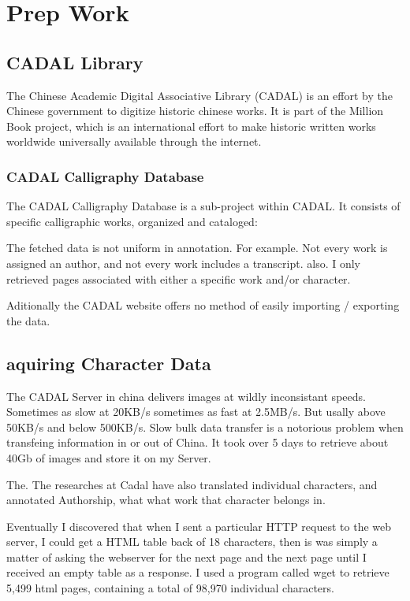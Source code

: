 \chapter{Prep Work}

\section{CADAL Library}

The Chinese Academic Digital Associative Library (CADAL) is an effort by the Chinese government to digitize historic chinese works.  It is part of the Million Book project, which is an international effort to make historic written works worldwide universally available through the internet.

\subsection{CADAL Calligraphy Database}
The CADAL Calligraphy Database is a sub-project within CADAL.  It consists of specific calligraphic works, organized and cataloged:


The fetched data is not uniform in annotation.  For example.  Not every work is assigned an author, and not every work includes a transcript.  also.  I only retrieved pages associated with either a specific work and/or character.

Aditionally the CADAL website offers no method of easily importing / exporting the data.  

\section{aquiring Character Data}

The CADAL Server in china delivers images at wildly inconsistant speeds.  Sometimes as slow at 20KB/s sometimes as fast at 2.5MB/s.  But usally above 50KB/s and below 500KB/s.  Slow bulk data transfer is a notorious problem when transfeing information in or out of China.  It took over 5 days to retrieve about 40Gb of images and store it on my Server.

The.  The researches at Cadal have also translated individual characters, and annotated Authorship, what what work that character belongs in.

Eventually I discovered that when I sent a particular HTTP request to the web server, I could get a HTML table back of 18 characters,  then is was simply a matter of asking the webserver for the next page and the next page until I received an empty table as a response.  I used a program called wget to retrieve 5,499 html pages, containing a total of 98,970 individual characters.

